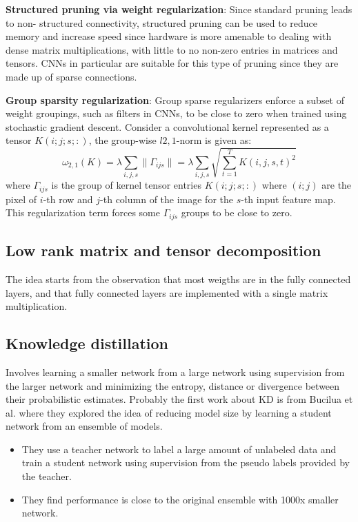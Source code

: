 \textbf{Structured pruning via weight regularization}: Since standard pruning leads to non-
structured connectivity, structured pruning can be used to reduce memory and increase speed since 
hardware is more amenable to dealing with dense matrix multiplications, with little to no non-zero
entries in matrices and tensors. CNNs in particular are suitable for this type of pruning since 
they are made up of sparse connections.

\textbf{Group sparsity regularization}: Group sparse regularizers enforce a subset of weight 
groupings, such as filters in CNNs, to be close to zero when trained using stochastic gradient 
descent. Consider a convolutional kernel represented as a tensor $K(i; j; s; :)$, the group-wise 
$l2, 1$-norm is given as:
\begin{equation*}
    \omega_{2, 1} (K) = \lambda \sum_{i, j, s} \| \Gamma_{ijs}\| = \lambda \sum_{i, j, s} \sqrt{\sum_{t= 1}^T K(i, j, s, t)^2}
\end{equation*}
where $\Gamma_{ijs}$ is the group of kernel tensor entries $K(i; j; s; :)$ where $(i; j)$ are the 
pixel of $i$-th row and $j$-th column of the image for the $s$-th input feature map. This 
regularization term forces some $\Gamma_{ijs}$ groups to be close to zero.

\subsection{Low rank matrix and tensor decomposition} 
The idea starts from the observation that most weigths are in the fully connected layers, and that 
fully connected layers are implemented with a single matrix multiplication.
\subsection{Knowledge distillation} 
Involves learning a smaller network from a large network using supervision from the larger network and
minimizing the entropy, distance or divergence between their probabilistic estimates. Probably the 
first work about KD is from Bucilua et al. where they explored the idea of reducing model size by 
learning a student network from an ensemble of models.
\begin{itemize}
    \item They use a teacher network to label a large amount of unlabeled data and train a student 
        network using supervision from the pseudo labels provided by the teacher.
    \item They find performance is close to the original ensemble with 1000x smaller network.
\end{itemize}
    
